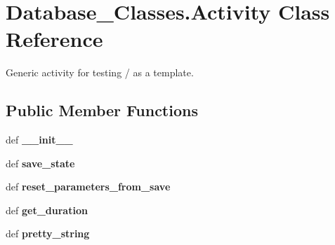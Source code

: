 \hypertarget{classDatabase__Classes_1_1Activity}{\section{Database\-\_\-\-Classes.\-Activity Class Reference}
\label{classDatabase__Classes_1_1Activity}
}


Generic activity for testing / as a template.  


\subsection*{Public Member Functions}
\begin{DoxyCompactItemize}
\item 
\hypertarget{classDatabase__Classes_1_1Activity_a5017887db3b072677022ce35c3512a33}{def {\bfseries \-\_\-\-\_\-init\-\_\-\-\_\-}}\label{classDatabase__Classes_1_1Activity_a5017887db3b072677022ce35c3512a33}

\item 
\hypertarget{classDatabase__Classes_1_1Activity_a008a711f8035ce5790d9c85097c5748a}{def {\bfseries save\-\_\-state}}\label{classDatabase__Classes_1_1Activity_a008a711f8035ce5790d9c85097c5748a}

\item 
\hypertarget{classDatabase__Classes_1_1Activity_afecd5fb90df723c4b3f4b2ba7eee14cd}{def {\bfseries reset\-\_\-parameters\-\_\-from\-\_\-save}}\label{classDatabase__Classes_1_1Activity_afecd5fb90df723c4b3f4b2ba7eee14cd}

\item 
\hypertarget{classDatabase__Classes_1_1Activity_ae6ba07eeb9e023dc9109a18b1d58c0e9}{def {\bfseries get\-\_\-duration}}\label{classDatabase__Classes_1_1Activity_ae6ba07eeb9e023dc9109a18b1d58c0e9}

\item 
\hypertarget{classDatabase__Classes_1_1Activity_a803a0c548bb38dcfcd4af1dc399cc004}{def {\bfseries pretty\-\_\-string}}\label{classDatabase__Classes_1_1Activity_a803a0c548bb38dcfcd4af1dc399cc004}

\end{DoxyCompactItemize}
